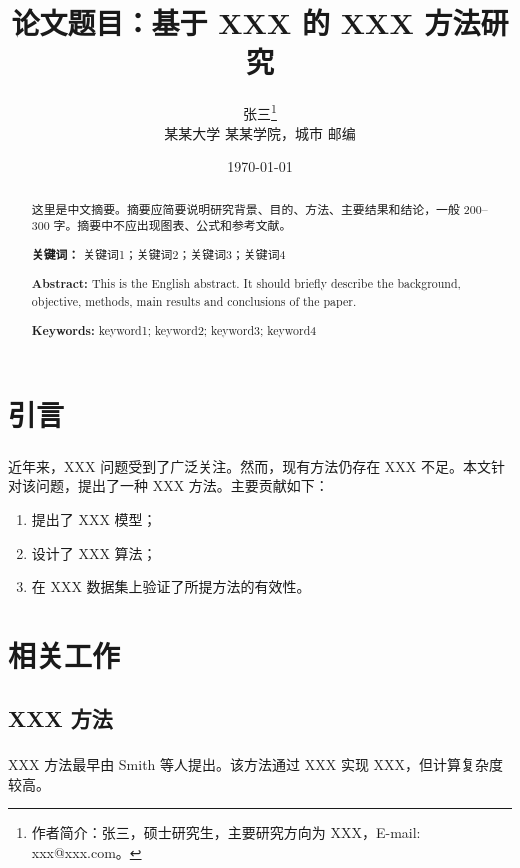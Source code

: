\documentclass[12pt, a4paper]{ctexart}
\title{\heiti 论文题目：基于 XXX 的 XXX 方法研究}
\author{
    张三\thanks{作者简介：张三，硕士研究生，主要研究方向为 XXX，E-mail: xxx@xxx.com。} \\
    某某大学 某某学院，城市 邮编
}
\date{\today}
\newcommand{\upcite}[1]{\textsuperscript{\cite{#1}}}
\begin{document}
\maketitle

\begin{abstract}
\noindent 这里是中文摘要。摘要应简要说明研究背景、目的、方法、主要结果和结论，一般 200--300 字。摘要中不应出现图表、公式和参考文献。

\vspace{1em}
\noindent\textbf{关键词：} 关键词1；关键词2；关键词3；关键词4

\vspace{1em}
\noindent\textbf{Abstract:} This is the English abstract. It should briefly describe the background, objective, methods, main results and conclusions of the paper.

\vspace{0.5em}
\noindent\textbf{Keywords:} keyword1; keyword2; keyword3; keyword4
\end{abstract}

\vspace{1em}

\section{引言}
\label{sec:introduction}

近年来，XXX 问题受到了广泛关注\upcite{ref1}。然而，现有方法仍存在 XXX 不足\upcite{ref2}。本文针对该问题，提出了一种 XXX 方法。主要贡献如下：

\begin{enumerate}
    \item 提出了 XXX 模型；
    \item 设计了 XXX 算法；
    \item 在 XXX 数据集上验证了所提方法的有效性。
\end{enumerate}

\section{相关工作}
\label{sec:related}

\subsection{XXX 方法}
XXX 方法最早由 Smith 等人提出\upcite{ref2}。该方法通过 XXX 实现 XXX，但计算复杂度较高。
\end{document}
